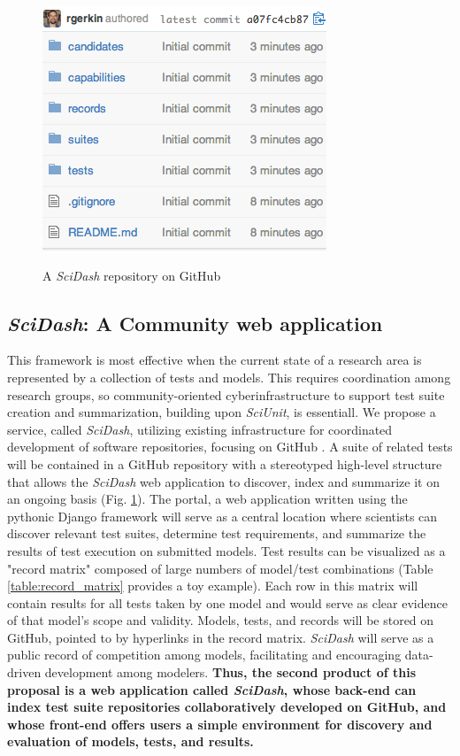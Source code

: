 \documentclass[11pt,letterpaper]{article}
\begin{document}
\begin{figure}
\centering
\includegraphics[scale=0.7]{scidash_github.png}
\label{fig:scidash_repo}
\caption{A \textit{SciDash} repository on GitHub}
\end{figure}
\leavevmode
{}    
\subsection{\textit{SciDash}: A Community web application}
This framework is most effective when the current state of a research area is represented by a collection of tests and models. This requires coordination among research groups, so community-oriented cyberinfrastructure to support test suite creation and summarization, building upon \textit{SciUnit}, is essentiall. We propose a service, called \textit{SciDash}, utilizing existing infrastructure for coordinated development of software repositories, focusing on GitHub \cite{github_url} \cite{ram_git_2013}. A suite of related tests will be contained in a GitHub repository with a stereotyped high-level structure that allows the \textit{SciDash} web application to discover, index and summarize it on an ongoing basis (Fig. \ref{fig:scidash_repo}). The portal, a web application written using the pythonic Django framework \cite{django_url} will serve as a central location where scientists can discover relevant test suites, determine test requirements, and summarize the results of test execution on submitted models. Test results can be visualized as a "record matrix" composed of large numbers of model/test combinations (Table \ref{table:record_matrix} provides a toy example).  Each row in this matrix will contain results for all tests taken by one model and would serve as clear evidence of that model's scope and validity.  Models, tests, and records will be stored on GitHub, pointed to by hyperlinks in the record matrix. \textit{SciDash} will serve as a public record of competition among models, facilitating and encouraging data-driven development among modelers. \textbf{Thus, the second product of this proposal is a web application called \textit{SciDash}, whose back-end can index test suite repositories collaboratively developed on GitHub, and whose front-end offers users a simple environment for discovery and evaluation of models, tests, and results.}  
\end{document}
